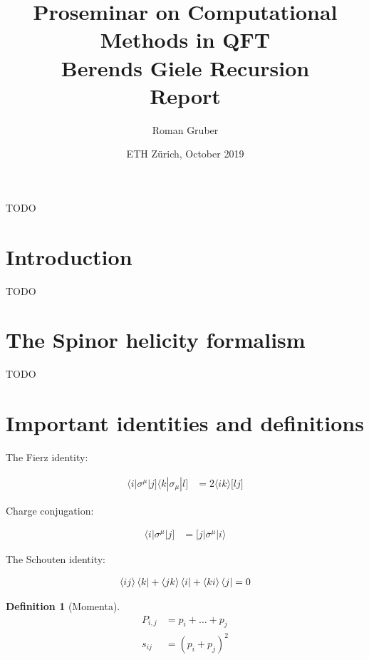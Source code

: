 \documentclass{article}
\title{Proseminar on Computational Methods in QFT \\ Berends Giele Recursion \\ Report}
\author{Roman Gruber}
\date{ETH Zürich, October 2019}
\theoremstyle{definition}
\newtheorem{definition}{Definition}[section]
\numberwithin{equation}{section}
\begin{document}
\maketitle

\abstract 
TODO
\newline

\doclicenseThis

\noindent\textcolor{gray}{\hrulefill}

\tableofcontents

\noindent\textcolor{gray}{\hrulefill}

\section{Introduction}

TODO

\section{The Spinor helicity formalism}

TODO

\section{Important identities and definitions}

The Fierz identity:

\begin{align}
    \langle i | \sigma^{\mu} | j \rbrack \langle k | \sigma_{\mu} | l \rbrack &= 2 \langle ik \rangle \lbrack lj \rbrack \label{eq:fierz} 
\end{align}

Charge conjugation:

\begin{align}
    \langle i | \sigma^{\mu} | j \rbrack &= \lbrack j | \overline{\sigma}^{\mu} | i \rangle \label{eq:ijji}
\end{align}

The Schouten identity:

\begin{align}
    \langle ij \rangle \bra{k} + \langle jk \rangle \bra{i} + \langle ki \rangle \bra{j} = 0 \label{eq:schouten}
\end{align}

\begin{definition}[Momenta]

\begin{align}
     P_{i,j} &= p_i + \dots + p_j \\
     s_{ij} &= \left( p_i + p_j \right)^2
\end{align}

\end{definition}
\end{document}
